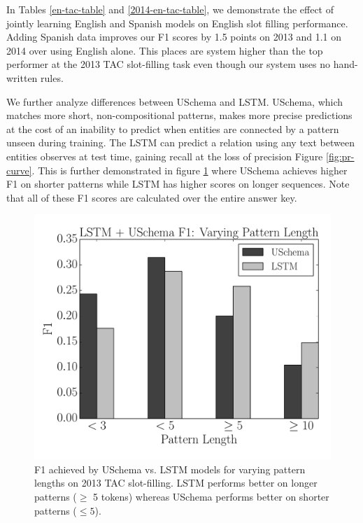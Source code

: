 
In Tables \ref{en-tac-table} and \ref{2014-en-tac-table}, we demonstrate the effect of jointly learning English and Spanish models on English slot filling performance. Adding Spanish data improves our F1 scores by 1.5 points on 2013 and 1.1 on 2014 over using English alone. This places are system higher than the top performer at the 2013 TAC slot-filling task even though our system uses no hand-written rules.

We further analyze differences between USchema and LSTM. USchema, which matches more short, non-compositional patterns, makes more precise predictions at the cost of an inability to predict when entities are connected by a pattern unseen during training. The LSTM can predict a relation using any text between entities observes at test time, gaining recall at the loss of precision Figure \ref{fig:pr-curve}. This is further demonstrated in figure \ref{fig:f1-vary-pats} where USchema achieves higher F1 on shorter patterns while LSTM has higher scores on longer sequences. Note that all of these F1 scores are calculated over the entire answer key.

\begin{figure}
\begin{center}
\includegraphics[scale=0.45]{f1-vary-pat-length}
\caption{F1 achieved by USchema vs. LSTM models for varying pattern lengths on 2013 TAC slot-filling. LSTM performs better on longer patterns ($\geq$ 5 tokens) whereas USchema performs better on shorter patterns ($\leq 5$). \label{fig:f1-vary-pats}}
\end{center}
\end{figure}

